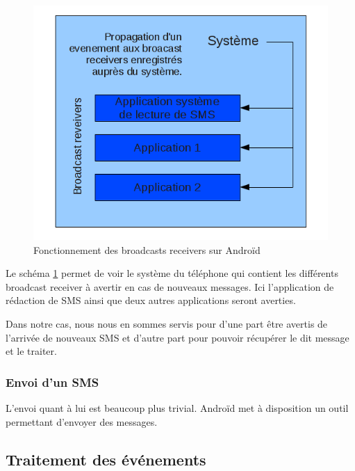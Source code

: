 \begin{figure}[!h]
  \center
  \includegraphics[width=12cm]{img/broadcast-receivers.png}
  \caption{Fonctionnement des broadcasts receivers sur Androïd}
  \label{broadcast-receivers}
\end{figure}
 
Le schéma \ref{broadcast-receivers} permet de voir le système du téléphone qui contient les différents broadcast receiver à avertir en cas de nouveaux messages. Ici l'application de rédaction de SMS ainsi que deux autres 
applications seront averties.
 
Dans notre cas, nous nous en sommes servis pour d'une part être avertis de l'arrivée de nouveaux SMS et d'autre part pour pouvoir récupérer le dit message et le traiter.
\\
 
 
\subsubsection{Envoi d'un SMS}
 
L'envoi quant à lui est beaucoup plus trivial. Androïd met à disposition un outil permettant d'envoyer
des messages.
\\
 
 
 
\subsection{Traitement des événements}
 
